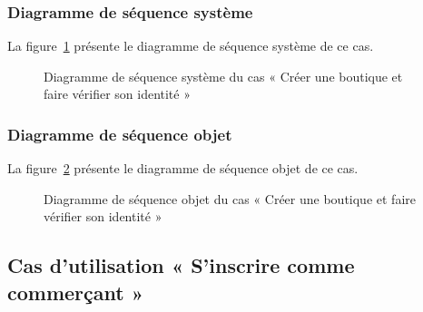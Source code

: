 \subsubsection{Diagramme de séquence système}
La figure~\ref{fig:dss-kyc} présente le diagramme de séquence système de ce cas.
\begin{figure}[H]
    \centering
    \caption{Diagramme de séquence système du cas « Créer une boutique et faire vérifier son identité »}
    \label{fig:dss-kyc}
\end{figure}

\subsubsection{Diagramme de séquence objet}
La figure~\ref{fig:dso-kyc} présente le diagramme de séquence objet de ce cas.
\begin{figure}[H]
    \centering
    \caption{Diagramme de séquence objet du cas « Créer une boutique et faire vérifier son identité »}
    \label{fig:dso-kyc}
\end{figure}

\subsection{Cas d'utilisation « S'inscrire comme commerçant »}
